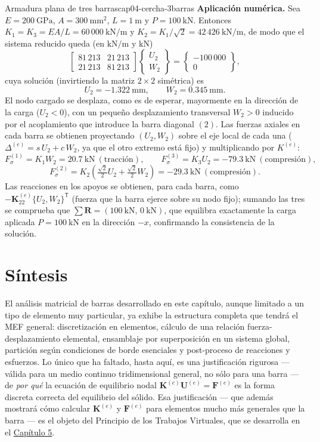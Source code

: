 \begin{ejemplo}{Armadura plana de tres barras}{cap04-cercha-3barras}
\textbf{Aplicación numérica.} Sea $E=200\ \mathrm{GPa}$, $A=300\ \mathrm{mm^2}$, $L=1\ \mathrm{m}$ y $P=100\ \mathrm{kN}$. Entonces $K_1=K_3=EA/L=60\,000\ \mathrm{kN/m}$ y $K_2=K_1/\sqrt2=42\,426\ \mathrm{kN/m}$, de modo que el sistema reducido queda (en $\mathrm{kN/m}$ y $\mathrm{kN}$)
\[
\begin{bmatrix} 81\,213 & 21\,213 \\ 21\,213 & 81\,213 \end{bmatrix}\begin{Bmatrix}U_2\\W_2\end{Bmatrix} = \begin{Bmatrix}-100\,000\\0\end{Bmatrix},
\]
cuya solución (invirtiendo la matriz $2\times2$ simétrica) es
\[
U_2 = -1.322\ \mathrm{mm}, \qquad W_2 = 0.345\ \mathrm{mm} .
\]
El nodo cargado se desplaza, como es de esperar, mayormente en la dirección de la carga ($U_2<0$), con un pequeño desplazamiento transversal $W_2>0$ inducido por el acoplamiento que introduce la barra diagonal $(2)$. Las fuerzas axiales en cada barra se obtienen proyectando $(U_2,W_2)$ sobre el eje local de cada una ($\Delta^{(e)} = s\,U_2+c\,W_2$, ya que el otro extremo está fijo) y multiplicando por $K^{(e)}$:
\[
F_\sigma^{(1)} = K_1 W_2 = 20.7\ \mathrm{kN}\ (\text{tracción}), \qquad
F_\sigma^{(3)} = K_3 U_2 = -79.3\ \mathrm{kN}\ (\text{compresión}),
\]
\[
F_\sigma^{(2)} = K_2\left(\tfrac{\sqrt2}{2}U_2+\tfrac{\sqrt2}{2}W_2\right) = -29.3\ \mathrm{kN}\ (\text{compresión}).
\]
Las reacciones en los apoyos se obtienen, para cada barra, como $-\mathbf{K}_{22}^{(e)}\{U_2,W_2\}^{\mathsf T}$ (fuerza que la barra ejerce sobre su nodo fijo); sumando las tres se comprueba que $\sum \mathbf{R} = (100\ \mathrm{kN},\,0\ \mathrm{kN})$, que equilibra exactamente la carga aplicada $P=100\ \mathrm{kN}$ en la dirección $-x$, confirmando la consistencia de la solución.
\end{ejemplo}

\section{Síntesis}

El análisis matricial de barras desarrollado en este capítulo, aunque limitado a un tipo de elemento muy particular, ya exhibe la estructura completa que tendrá el MEF general: discretización en elementos, cálculo de una relación fuerza-desplazamiento elemental, ensamblaje por superposición en un sistema global, partición según condiciones de borde esenciales y post-proceso de reacciones y esfuerzos. Lo único que ha faltado, hasta aquí, es una justificación rigurosa --- válida para un medio continuo tridimensional general, no sólo para una barra --- de \emph{por qué} la ecuación de equilibrio nodal $\mathbf{K}^{(e)}\mathbf{U}^{(e)}=\mathbf{F}^{(e)}$ es la forma discreta correcta del equilibrio del sólido. Esa justificación --- que además mostrará cómo calcular $\mathbf{K}^{(e)}$ y $\mathbf{F}^{(e)}$ para elementos mucho más generales que la barra --- es el objeto del Principio de los Trabajos Virtuales, que se desarrolla en el \hyperref[cap:cap05-ptv]{Capítulo 5}.
